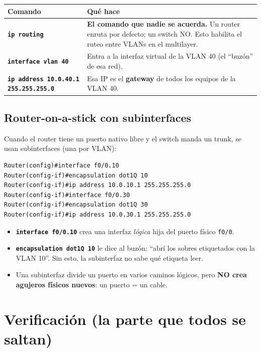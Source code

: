 \documentclass[11pt,a4paper]{report}
\newcommand{\cmd}[1]{\texttt{\textbf{#1}}}
\begin{document}
\begin{longtable}{@{}p{6.5cm}p{9cm}@{}}
\toprule
\textbf{Comando} & \textbf{Qué hace} \\
\midrule
\endhead
\cmd{ip routing} & \textbf{El comando que nadie se acuerda.} Un router enruta por defecto; un switch NO. Esto habilita el ruteo entre VLANs en el multilayer. \\
\addlinespace
\cmd{interface vlan 40} & Entra a la interfaz virtual de la VLAN 40 (el ``buzón'' de esa red). \\
\addlinespace
\cmd{ip address 10.0.40.1 255.255.255.0} & Esa IP es el \textbf{gateway} de todos los equipos de la VLAN 40. \\
\bottomrule
\end{longtable}

\section{Router-on-a-stick con subinterfaces}

Cuando el router tiene un puerto nativo libre y el switch manda un trunk, se usan subinterfaces (una por VLAN):

\begin{lstlisting}
Router(config)#interface f0/0.10
Router(config-if)#encapsulation dot1Q 10
Router(config-if)#ip address 10.0.10.1 255.255.255.0
Router(config-if)#interface f0/0.30
Router(config-if)#encapsulation dot1Q 30
Router(config-if)#ip address 10.0.30.1 255.255.255.0
\end{lstlisting}

\begin{itemize}
  \item \cmd{interface f0/0.10} crea una interfaz \emph{lógica} hija del puerto físico \texttt{f0/0}.
  \item \cmd{encapsulation dot1Q 10} le dice al buzón: ``abrí los sobres etiquetados con la VLAN 10''. Sin esto, la subinterfaz no sabe qué etiqueta leer.
  \item Una subinterfaz divide un puerto en varios caminos lógicos, pero \textbf{NO crea agujeros físicos nuevos}: un puerto = un cable.
\end{itemize}

\chapter{Verificación (la parte que todos se saltan)}
\end{document}
